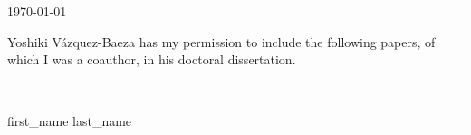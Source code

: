 \documentclass{article}
\begin{document}
\today

\bigskip
\bigskip
\bigskip

Yoshiki V\'azquez-Baeza has my permission to include the following papers, of
which I was a coauthor, in his doctoral dissertation.


\bigskip
\bigskip
\bigskip

\noindent
\rule{5cm}{1pt} \\
{{ first_name }} {{ last_name }}
\end{document}
